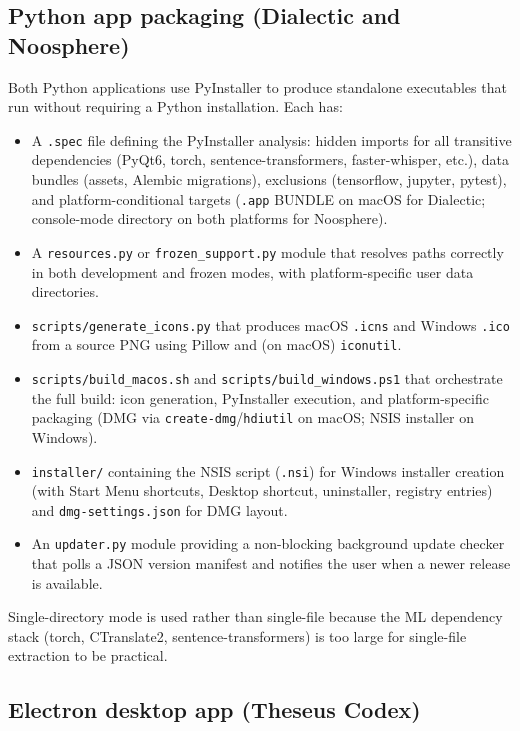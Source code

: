\documentclass[11pt,letterpaper]{article}
\newcommand{\file}[1]{\texttt{#1}}
\begin{document}
\subsection{Python app packaging (Dialectic and Noosphere)}

Both Python applications use PyInstaller to produce standalone executables that run without requiring a Python installation. Each has:

\begin{itemize}[leftmargin=1.5em,itemsep=0.1em]
  \item A \file{.spec} file defining the PyInstaller analysis: hidden imports for all transitive dependencies (PyQt6, torch, sentence-transformers, faster-whisper, etc.), data bundles (assets, Alembic migrations), exclusions (tensorflow, jupyter, pytest), and platform-conditional targets (\texttt{.app} BUNDLE on macOS for Dialectic; console-mode directory on both platforms for Noosphere).
  \item A \file{resources.py} or \file{frozen\_support.py} module that resolves paths correctly in both development and frozen modes, with platform-specific user data directories.
  \item \file{scripts/generate\_icons.py} that produces macOS \texttt{.icns} and Windows \texttt{.ico} from a source PNG using Pillow and (on macOS) \texttt{iconutil}.
  \item \file{scripts/build\_macos.sh} and \file{scripts/build\_windows.ps1} that orchestrate the full build: icon generation, PyInstaller execution, and platform-specific packaging (DMG via \texttt{create-dmg}/\texttt{hdiutil} on macOS; NSIS installer on Windows).
  \item \file{installer/} containing the NSIS script (\texttt{.nsi}) for Windows installer creation (with Start Menu shortcuts, Desktop shortcut, uninstaller, registry entries) and \file{dmg-settings.json} for DMG layout.
  \item An \file{updater.py} module providing a non-blocking background update checker that polls a JSON version manifest and notifies the user when a newer release is available.
\end{itemize}

Single-directory mode is used rather than single-file because the ML dependency stack (torch, CTranslate2, sentence-transformers) is too large for single-file extraction to be practical.

\subsection{Electron desktop app (Theseus Codex)}
\end{document}
